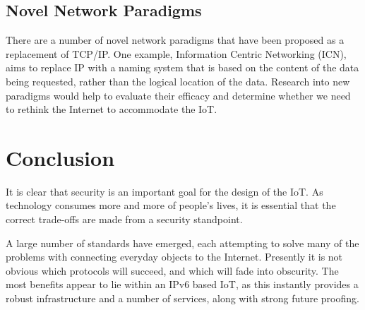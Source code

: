 \documentclass[10pt,journal,compsoc]{IEEEtran}
\begin{document}
\subsection{Novel Network Paradigms}
There are a number of novel network paradigms that have been proposed as a
replacement of TCP/IP. One example, Information Centric Networking (ICN), aims
to replace IP with a naming system that is based on the content of the data
being requested, rather than the logical location of the data. Research into
new paradigms would help to evaluate their efficacy and determine whether we
need to rethink the Internet to accommodate the IoT. 


\section{Conclusion}
It is clear that security is an important goal for the design of the IoT. As
technology consumes more and more of people's lives, it is essential that the
correct trade-offs are made from a security standpoint. 

A large number of standards have emerged, each attempting to solve many of the
problems with connecting everyday objects to the Internet. Presently it is not
obvious which protocols will succeed, and which will fade into obscurity. The
most benefits appear to lie within an IPv6 based IoT, as this instantly
provides a robust infrastructure and a number of services, along with strong
future proofing.  



%
%
%

{}

\end{document}
